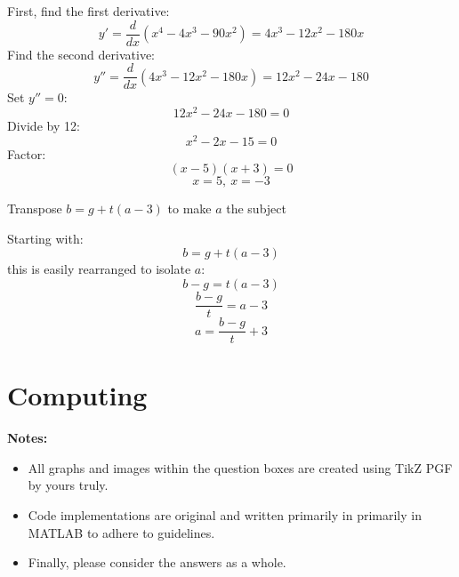 \documentclass[a4paper, 12pt]{report}
\def\ni{blue!20!white}
\begin{document}
    First, find the first derivative:
    \[y' = \frac{d}{dx}(x^4 - 4x^3 - 90x^2) = 4x^3 - 12x^2 - 180x\]
    Find the second derivative:
    \[y'' = \frac{d}{dx}(4x^3 - 12x^2 - 180x) = 12x^2 - 24x - 180\]
    Set \( y'' = 0 \):
    \[12x^2 - 24x - 180 = 0\]
    Divide by 12:
    \[x^2 - 2x - 15 = 0\]
    Factor:
    \[(x - 5)(x + 3) = 0\]
    \[\boxed{x = 5,\ x = -3}\]
    
    \newpage
    \begin{tcolorbox}[title=\color{black}{\section{Q10}}, colback=white, colframe=\ni, boxrule=1mm, width=1\textwidth]
        Transpose \( b=g+t(a-3) \) to make \( a \) the subject
    \end{tcolorbox}
    
    Starting with:
    \[b = g + t(a - 3)\]
    this is easily rearranged to isolate \( a \):
    \[b - g = t(a - 3)\]
    \[\frac{b - g}{t} = a - 3\]
    \[\boxed{a = \frac{b - g}{t} + 3}\]
    
    \newpage

    
    \chapter{Computing}    
    \thispagestyle{empty}
    \begin{center}
        \Large\textbf{Notes:}
    \end{center}
    \begin{itemize} 
        \item All graphs and images within the question boxes are created using TikZ PGF by yours truly. 
        \item Code implementations are original and written primarily in primarily in MATLAB to adhere to guidelines.
        \item Finally, please consider the answers as a whole. 
    \end{itemize}
    


    \newpage
    \setcounter{page}{11}
    \centering
    \newpage
    
\end{document}

